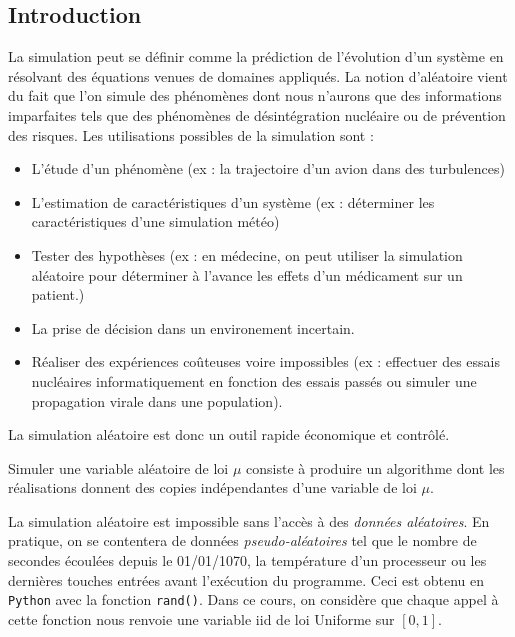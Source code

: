 
\minitoc 


\subsection{Introduction}

La simulation peut se définir comme la prédiction de l'évolution d'un système en résolvant des équations 
venues de domaines appliqués. 
La notion d'aléatoire vient du fait que l'on simule des phénomènes dont nous n'aurons que des informations imparfaites 
tels que des phénomènes de désintégration nucléaire ou de prévention des risques. Les utilisations 
possibles de la simulation sont : 
\begin{itemize}
    \item L'étude d'un phénomène (ex : la trajectoire d'un avion dans des turbulences)
    \item L'estimation de caractéristiques d'un système (ex : déterminer les caractéristiques d'une simulation météo)
    \item Tester des hypothèses (ex : en médecine, on peut utiliser la simulation aléatoire pour déterminer à l'avance 
    les effets d'un médicament sur un patient.)
    \item La prise de décision dans un environement incertain. 
    \item Réaliser des expériences coûteuses voire impossibles (ex : effectuer des essais nucléaires informatiquement 
    en fonction des essais passés ou simuler une propagation virale dans une population). 
\end{itemize}
La simulation aléatoire est donc un outil rapide économique et contrôlé. 

\begin{definition}
    Simuler une variable aléatoire de loi $\mu$ consiste à produire un algorithme dont les réalisations donnent 
    des copies indépendantes d'une variable de loi $ \mu$. 
\end{definition}

La simulation aléatoire est impossible sans l'accès à des \emph{données aléatoires}. En pratique, on se contentera 
de données \emph{pseudo-aléatoires} tel que le nombre de secondes écoulées depuis le 01/01/1070, la température 
d'un processeur ou les dernières touches entrées avant l'exécution du programme. 
Ceci est obtenu en \texttt{Python} avec la fonction \texttt{rand()}.  Dans ce cours, on considère que chaque appel 
à cette fonction nous renvoie une variable iid de loi Uniforme sur $[0,1]$. 

